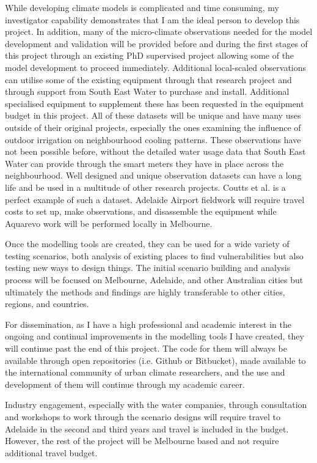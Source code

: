 While developing climate models is complicated and time consuming, my investigator capability demonstrates that I am the ideal person to develop this project. In addition, many of the micro-climate observations needed for the model development and validation will be provided before and during the first stages of this project through an existing PhD supervised project allowing some of the model development to proceed immediately. Additional local-scaled observations can utilise some of the existing equipment through that research project and through support from South East Water to purchase and install. Additional specialised equipment to supplement these has been requested in the equipment budget in this project. All of these datasets will be unique and have many uses outside of their original projects, especially the ones examining the influence of outdoor irrigation on neighbourhood cooling patterns. These observations have not been possible before, without the detailed water usage data that South East Water can provide through the smart meters they have in place across the neighbourhood. Well designed and unique observation datasets can have a long life and be used in a multitude of other research projects. Coutts et al.\cite{Coutts2007} is a perfect example of such a dataset. Adelaide Airport fieldwork will require travel costs to set up, make observations, and disassemble the equipment while Aquarevo work will be performed locally in Melbourne.

Once the modelling tools are created, they can be used for a wide variety of testing scenarios, both analysis of existing places to find vulnerabilities but also testing new ways to design things. The initial scenario building and analysis process will be focused on Melbourne, Adelaide, and other Australian cities but ultimately the methods and findings are highly transferable to other cities, regions, and countries.

For dissemination, as I have a high professional and academic interest in the ongoing and continual improvements in the modelling tools I have created, they will continue past the end of this project. The code for them will always be available through open repositories (i.e. Github or Bitbucket), made available to the international community of urban climate researchers, and the use and development of them will continue through my academic career. 

Industry engagement, especially with the water companies, through consultation and workshops to work through the scenario designs will require travel to Adelaide in the second and third years and travel is included in the budget. However, the rest of the project will be Melbourne based and not require additional travel budget.

